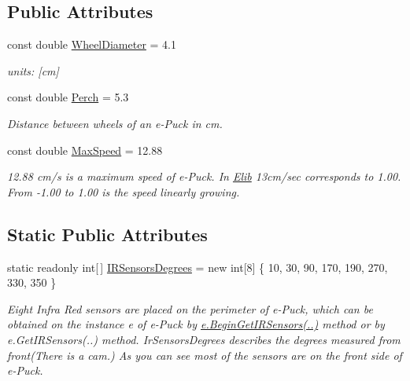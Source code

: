   


  \subsection*{Public Attributes}
  \begin{DoxyCompactItemize}
  \item 
  const double \hyperlink{class_elib_1_1_epuck_afef1fb969494d5992aaac3146c9b3f5f}{WheelDiameter} = 4.1
  \begin{DoxyCompactList}\small\item\em units: \mbox{[}cm\mbox{]} \item\end{DoxyCompactList}\item 
  const double \hyperlink{class_elib_1_1_epuck_a07d37f0deafd97a37fcea3c667ae3984}{Perch} = 5.3
  \begin{DoxyCompactList}\small\item\em Distance between wheels of an e-\/Puck in cm. \item\end{DoxyCompactList}\item 
  const double \hyperlink{class_elib_1_1_epuck_a1c5722494d807e6a5df5835c722d4d6e}{MaxSpeed} = 12.88
  \begin{DoxyCompactList}\small\item\em 12.88 cm/s is a maximum speed of e-\/Puck. In \hyperlink{namespace_elib}{Elib} 13cm/sec corresponds to 1.00. From -\/1.00 to 1.00 is the speed linearly growing. \item\end{DoxyCompactList}\end{DoxyCompactItemize}
  \subsection*{Static Public Attributes}
  \begin{DoxyCompactItemize}
  \item 
  static readonly int\mbox{[}$\,$\mbox{]} \hyperlink{class_elib_1_1_epuck_ab1705fc7b8cacf430c8060ee9c0b5d93}{IRSensorsDegrees} = new int\mbox{[}8\mbox{]} \{ 10, 30, 90, 170, 190, 270, 330, 350 \}
  \begin{DoxyCompactList}\small\item\em Eight Infra Red sensors are placed on the perimeter of e-\/Puck, which can be obtained on the instance e of e-\/Puck by \hyperlink{}{e.BeginGetIRSensors(..)} method or by {\ttfamily e.GetIRSensors(..)} method. IrSensorsDegrees describes the degrees measured from front(There is a cam.) As you can see most of the sensors are on the front side of e-\/Puck. \item\end{DoxyCompactList}\end{DoxyCompactItemize}
